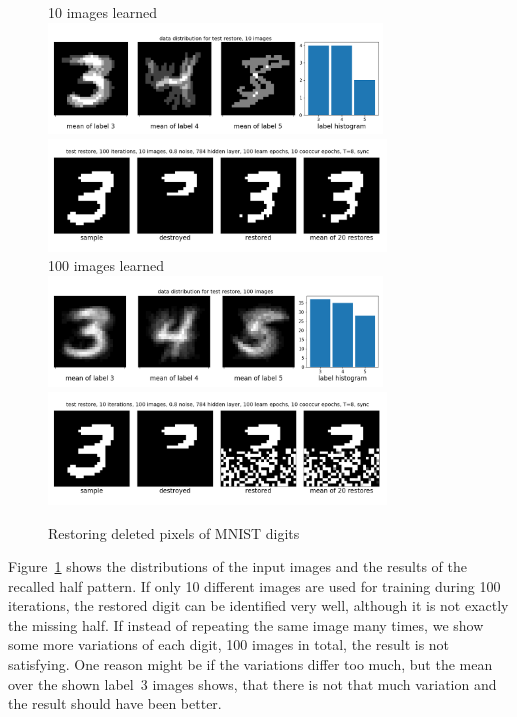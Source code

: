 \documentclass[12pt,twoside]{article}
\theoremstyle{plain}
\theoremstyle{definition}
\theoremstyle{remark}
\begin{document}
\begin{figure}[t!]
	\begin{center}
	10 images learned
	\includegraphics[trim={0.2cm 0.5cm 0cm 1.7cm},clip,width=0.79\textwidth]{src/data_distribution_10_images}
	\includegraphics[trim={0cm 1.0cm 0cm 0cm},clip,width=0.8\textwidth]{src/test_restore_10_images}\\
	100 images learned
	\includegraphics[trim={0.2cm 0.5cm 0cm 1.7cm},clip,width=0.79\textwidth]{src/data_distribution_100_images}
	\includegraphics[trim={0cm 1.0cm 0cm 0cm},clip,width=0.8\textwidth]{src/test_restore_100_images}
	\end{center}
	\caption{Restoring deleted pixels of MNIST digits}\label{fig:test_restore}
\end{figure}

Figure~\ref{fig:test_restore} shows the distributions of the input images and the results of the recalled half pattern. 
If only 10 different images are used for training during 100 iterations, the restored digit can be identified very well, although it is not exactly the missing half.
If instead of repeating the same image many times, we show some more variations of each digit, 100 images in total, the result is not satisfying.
One reason might be if the variations differ too much, but the mean over the shown label~3 images shows, that there is not that much variation and the result should have been better.
\end{document}
